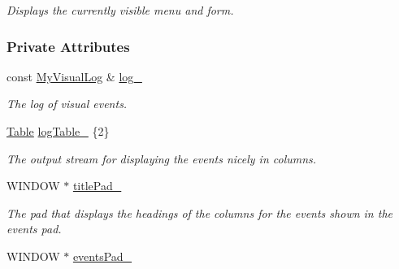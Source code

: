 \begin{DoxyCompactItemize}
\begin{DoxyCompactList}\small\item\em Displays the currently visible menu and form. \end{DoxyCompactList}\end{DoxyCompactItemize}
\subsubsection*{Private Attributes}
\begin{DoxyCompactItemize}
\item 
const \hyperlink{structslb_1_1core_1_1ui_1_1LogWindow_a740f38763dad694111118ff0ab6349a6}{My\+Visual\+Log} \& \hyperlink{structslb_1_1core_1_1ui_1_1LogWindow_aec055b29669019d1fba78cb571a15a75}{log\+\_\+}\hypertarget{structslb_1_1core_1_1ui_1_1LogWindow_aec055b29669019d1fba78cb571a15a75}{}\label{structslb_1_1core_1_1ui_1_1LogWindow_aec055b29669019d1fba78cb571a15a75}

\begin{DoxyCompactList}\small\item\em The log of visual events. \end{DoxyCompactList}\item 
\hyperlink{structslb_1_1core_1_1util_1_1Table}{Table} \hyperlink{structslb_1_1core_1_1ui_1_1LogWindow_a8eab8f0120ea01b325298ea662d7fec4}{log\+Table\+\_\+} \{2\}\hypertarget{structslb_1_1core_1_1ui_1_1LogWindow_a8eab8f0120ea01b325298ea662d7fec4}{}\label{structslb_1_1core_1_1ui_1_1LogWindow_a8eab8f0120ea01b325298ea662d7fec4}

\begin{DoxyCompactList}\small\item\em The output stream for displaying the events nicely in columns. \end{DoxyCompactList}\item 
W\+I\+N\+D\+OW $\ast$ \hyperlink{structslb_1_1core_1_1ui_1_1LogWindow_a2c99f6f6c9db3b129111735cff9e768c}{title\+Pad\+\_\+}\hypertarget{structslb_1_1core_1_1ui_1_1LogWindow_a2c99f6f6c9db3b129111735cff9e768c}{}\label{structslb_1_1core_1_1ui_1_1LogWindow_a2c99f6f6c9db3b129111735cff9e768c}

\begin{DoxyCompactList}\small\item\em The pad that displays the headings of the columns for the events shown in the events pad. \end{DoxyCompactList}\item 
W\+I\+N\+D\+OW $\ast$ \hyperlink{structslb_1_1core_1_1ui_1_1LogWindow_a81443ca407ba85c45913923d801e6981}{events\+Pad\+\_\+}\hypertarget{structslb_1_1core_1_1ui_1_1LogWindow_a81443ca407ba85c45913923d801e6981}{}\label{structslb_1_1core_1_1ui_1_1LogWindow_a81443ca407ba85c45913923d801e6981}


\end{DoxyCompactItemize}
